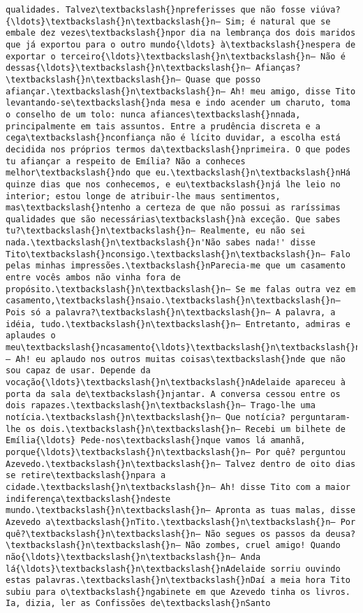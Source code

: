 \begin{Verbatim}[commandchars=\\\{\}]
qualidades. Talvez\textbackslash{}npreferisses que não fosse viúva?{\ldots}\textbackslash{}n\textbackslash{}n— Sim; é natural que se embale dez vezes\textbackslash{}npor dia na lembrança dos dois maridos que já exportou para o outro mundo{\ldots} à\textbackslash{}nespera de exportar o terceiro{\ldots}\textbackslash{}n\textbackslash{}n— Não é dessas{\ldots}\textbackslash{}n\textbackslash{}n— Afianças?\textbackslash{}n\textbackslash{}n— Quase que posso afiançar.\textbackslash{}n\textbackslash{}n— Ah! meu amigo, disse Tito levantando-se\textbackslash{}nda mesa e indo acender um charuto, toma o conselho de um tolo: nunca afiances\textbackslash{}nnada, principalmente em tais assuntos. Entre a prudência discreta e a cega\textbackslash{}nconfiança não é lícito duvidar, a escolha está decidida nos próprios termos da\textbackslash{}nprimeira. O que podes tu afiançar a respeito de Emília? Não a conheces melhor\textbackslash{}ndo que eu.\textbackslash{}n\textbackslash{}nHá quinze dias que nos conhecemos, e eu\textbackslash{}njá lhe leio no interior; estou longe de atribuir-lhe maus sentimentos, mas\textbackslash{}ntenho a certeza de que não possui as raríssimas qualidades que são necessárias\textbackslash{}nà exceção. Que sabes tu?\textbackslash{}n\textbackslash{}n— Realmente, eu não sei nada.\textbackslash{}n\textbackslash{}n'Não sabes nada!' disse Tito\textbackslash{}nconsigo.\textbackslash{}n\textbackslash{}n— Falo pelas minhas impressões.\textbackslash{}nParecia-me que um casamento entre vocês ambos não vinha fora de propósito.\textbackslash{}n\textbackslash{}n— Se me falas outra vez em casamento,\textbackslash{}nsaio.\textbackslash{}n\textbackslash{}n— Pois só a palavra?\textbackslash{}n\textbackslash{}n— A palavra, a idéia, tudo.\textbackslash{}n\textbackslash{}n— Entretanto, admiras e aplaudes o meu\textbackslash{}ncasamento{\ldots}\textbackslash{}n\textbackslash{}n— Ah! eu aplaudo nos outros muitas coisas\textbackslash{}nde que não sou capaz de usar. Depende da vocação{\ldots}\textbackslash{}n\textbackslash{}nAdelaide apareceu à porta da sala de\textbackslash{}njantar. A conversa cessou entre os dois rapazes.\textbackslash{}n\textbackslash{}n— Trago-lhe uma notícia.\textbackslash{}n\textbackslash{}n— Que notícia? perguntaram-lhe os dois.\textbackslash{}n\textbackslash{}n— Recebi um bilhete de Emília{\ldots} Pede-nos\textbackslash{}nque vamos lá amanhã, porque{\ldots}\textbackslash{}n\textbackslash{}n— Por quê? perguntou Azevedo.\textbackslash{}n\textbackslash{}n— Talvez dentro de oito dias se retire\textbackslash{}npara a cidade.\textbackslash{}n\textbackslash{}n— Ah! disse Tito com a maior indiferença\textbackslash{}ndeste mundo.\textbackslash{}n\textbackslash{}n— Apronta as tuas malas, disse Azevedo a\textbackslash{}nTito.\textbackslash{}n\textbackslash{}n— Por quê?\textbackslash{}n\textbackslash{}n— Não segues os passos da deusa?\textbackslash{}n\textbackslash{}n— Não zombes, cruel amigo! Quando não{\ldots}\textbackslash{}n\textbackslash{}n— Anda lá{\ldots}\textbackslash{}n\textbackslash{}nAdelaide sorriu ouvindo estas palavras.\textbackslash{}n\textbackslash{}nDaí a meia hora Tito subiu para o\textbackslash{}ngabinete em que Azevedo tinha os livros. Ia, dizia, ler as Confissões de\textbackslash{}nSanto 
\end{Verbatim}
